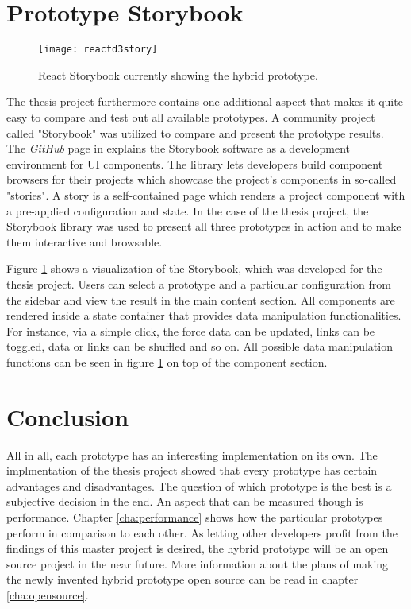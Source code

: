 \section{Prototype Storybook}

\begin{figure}
  \centering
  \texttt{[image: reactd3story]}
  \caption{React Storybook currently showing the hybrid prototype.}
  \label{fig:reactD3stroy}
\end{figure}

The thesis project furthermore contains one additional aspect that makes it quite easy to compare and test out all available prototypes. A community project called "Storybook" was utilized to compare and present the prototype results. The \emph{GitHub} page in \cite{ReactStorybook} explains the Storybook software as a development environment for UI components. The library lets developers build component browsers for their projects which showcase the project's components in so-called "stories". A story is a self-contained page which renders a project component with a pre-applied configuration and state. In the case of the thesis project, the Storybook library was used to present all three prototypes in action and to make them interactive and browsable. 

Figure \ref{fig:reactD3stroy} shows a visualization of the Storybook, which was developed for the thesis project. Users can select a prototype and a particular configuration from the sidebar and view the result in the main content section. All components are rendered inside a state container that provides data manipulation functionalities. For instance, via a simple click, the force data can be updated, links can be toggled, data or links can be shuffled and so on. All possible data manipulation functions can be seen in figure \ref{fig:reactD3stroy} on top of the component section.

\section{Conclusion}

All in all, each prototype has an interesting implementation on its own. The implmentation of the thesis project showed that every prototype has certain advantages and disadvantages. The question of which prototype is the best is a subjective decision in the end. An aspect that can be measured though is performance. Chapter \ref{cha:performance} shows how the particular prototypes perform in comparison to each other. As letting other developers profit from the findings of this master project is desired, the hybrid prototype will be an open source project in the near future. More information about the plans of making the newly invented hybrid prototype open source can be read in chapter \ref{cha:opensource}.